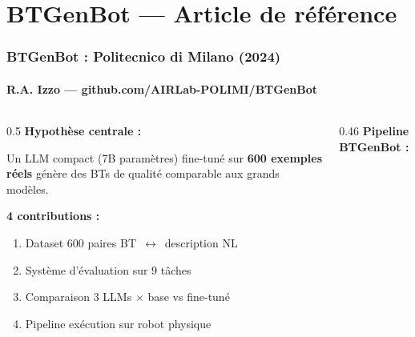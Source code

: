 \documentclass[aspectratio=169]{beamer}
\begin{document}
\section{BTGenBot — Article de référence}

\begin{frame}
  \frametitle{BTGenBot : Politecnico di Milano (2024)}
  \framesubtitle{R.A. Izzo — github.com/AIRLab-POLIMI/BTGenBot}

  \begin{columns}
    \begin{column}{0.5\textwidth}
      \textbf{Hypothèse centrale :}
      \begin{block}{}
        \small Un LLM compact (7B paramètres) fine-tuné sur \textbf{600 exemples réels}
        génère des BTs de qualité comparable aux grands modèles.
      \end{block}

      \vspace{0.3em}
      \textbf{4 contributions :}
      \begin{enumerate}\small
        \item Dataset 600 paires BT~$\leftrightarrow$~description NL
        \item Système d'évaluation sur 9 tâches
        \item Comparaison 3 LLMs $\times$ base vs fine-tuné
        \item Pipeline exécution sur robot physique
      \end{enumerate}
    \end{column}
    \begin{column}{0.46\textwidth}
      \textbf{Pipeline BTGenBot :}

      \vspace{0.3em}
    \end{column}
  \end{columns}
\end{frame}
\end{document}
